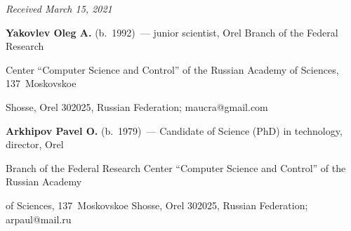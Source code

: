 {{

} }






\hfill{\small\textit{Received March 15, 2021}} 






\Contr



\noindent

\textbf{Yakovlev Oleg A.} (b.\ 1992)~--- junior scientist, Orel Branch of the Federal Research 

Center ``Computer Science and Control'' of the Russian Academy of Sciences, 137~Moskovskoe 

Shosse, Orel 302025, Russian Federation; \mbox{maucra@gmail.com}



\vspace*{6pt}



\noindent

\textbf{Arkhipov Pavel O.} (b.\ 1979)~--- Candidate of Science (PhD) in technology, director, Orel 

Branch of the Federal Research Center ``Computer Science and Control'' of the Russian Academy 

of Sciences, 137~Moskovskoe Shosse, Orel 302025, Russian Federation; \mbox{arpaul@mail.ru}



  

\label{end\stat}



\renewcommand{\bibname}{\protect\rm Литература} 

